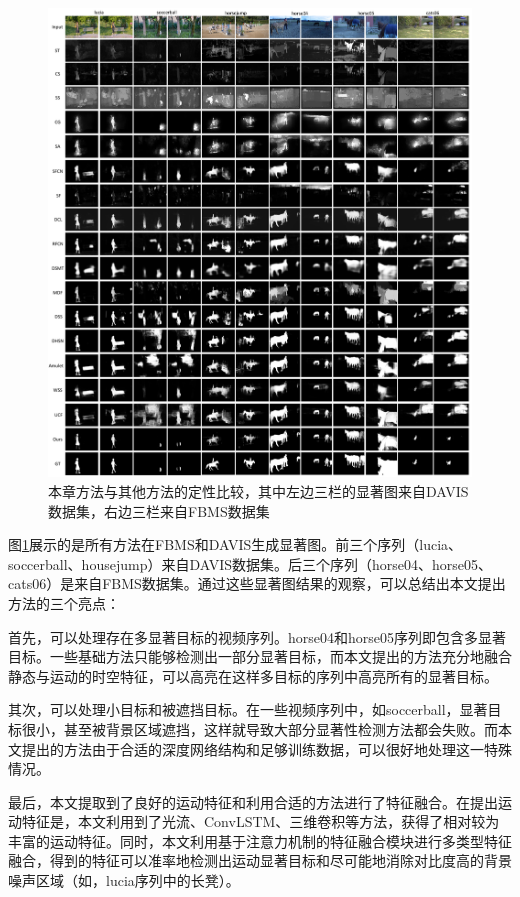 \begin{figure}
\centering
\includegraphics[width=1\textwidth]{figures/show}
\caption{本章方法与其他方法的定性比较，其中左边三栏的显著图来自DAVIS数据集，右边三栏来自FBMS数据集}
\label{figure5}
\end{figure}

图\ref{figure5}展示的是所有方法在FBMS和DAVIS生成显著图。前三个序列（lucia、soccerball、housejump）来自DAVIS数据集。后三个序列（horse04、horse05、cats06）是来自FBMS数据集。通过这些显著图结果的观察，可以总结出本文提出方法的三个亮点：

首先，可以处理存在多显著目标的视频序列。horse04和horse05序列即包含多显著目标。一些基础方法只能够检测出一部分显著目标，而本文提出的方法充分地融合静态与运动的时空特征，可以高亮在这样多目标的序列中高亮所有的显著目标。

其次，可以处理小目标和被遮挡目标。在一些视频序列中，如soccerball，显著目标很小，甚至被背景区域遮挡，这样就导致大部分显著性检测方法都会失败。而本文提出的方法由于合适的深度网络结构和足够训练数据，可以很好地处理这一特殊情况。

最后，本文提取到了良好的运动特征和利用合适的方法进行了特征融合。在提出运动特征是，本文利用到了光流、ConvLSTM、三维卷积等方法，获得了相对较为丰富的运动特征。同时，本文利用基于注意力机制的特征融合模块进行多类型特征融合，得到的特征可以准率地检测出运动显著目标和尽可能地消除对比度高的背景噪声区域（如，lucia序列中的长凳）。
